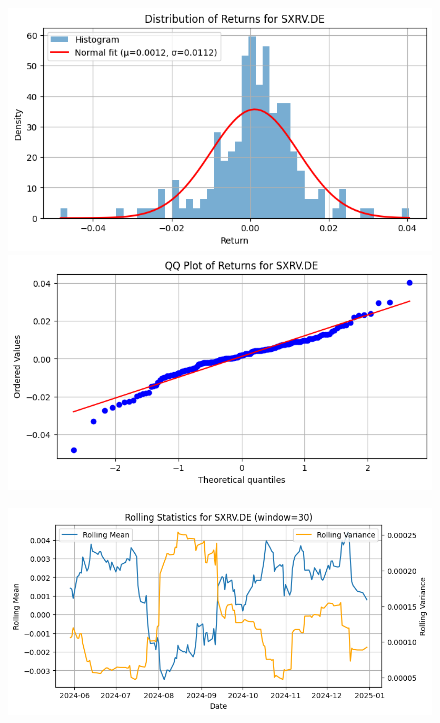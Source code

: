 \documentclass{article}%
\begin{document}
\begin{figure}[htbp]%
\begin{minipage}{0.49\textwidth}%
\includegraphics[width=\linewidth]{ticker_images/SXRV.DE_return_distribution.png}%
\end{minipage}%
\begin{minipage}{0.49\textwidth}%
\includegraphics[width=\linewidth]{ticker_images/SXRV.DE_qq_plot.png}%
\end{minipage}%
\end{figure}

%


\begin{figure}[htbp]%
\begin{minipage}{0.49\textwidth}%
\includegraphics[width=\linewidth]{ticker_images/SXRV.DE_rolling_stats.png}%
\end{minipage}%
\end{figure}
\end{document}
